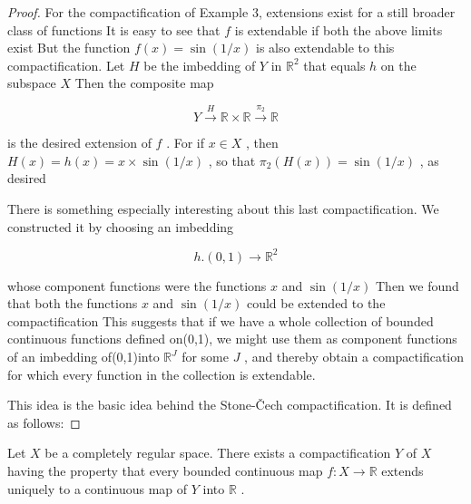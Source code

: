 \begin{proof}
For the compactification of Example 3, extensions exist for a still broader class of functions It is easy to see that \(f\) is extendable if both the above limits exist But the function \(f\left( x\right)  = \sin \left( {1/x}\right)\) is also extendable to this compactification. Let \(H\) be the imbedding of \(Y\) in \({\mathbb{R}}^{2}\) that equals \(h\) on the subspace \(X\) Then the composite map

\[
Y\overset{H}{ \rightarrow  }\mathbb{R} \times  \mathbb{R}\overset{{\pi }_{2}}{ \rightarrow  }\mathbb{R}
\]

is the desired extension of \(f\) . For if \(x \in  X\) , then \(H\left( x\right)  = h\left( x\right)  = x \times  \sin \left( {1/x}\right)\) , so that \({\pi }_{2}\left( {H\left( x\right) }\right)  = \sin \left( {1/x}\right)\) , as desired

There is something especially interesting about this last compactification. We constructed it by choosing an imbedding

\[
h.\left( {0,1}\right)  \rightarrow  {\mathbb{R}}^{2}
\]

whose component functions were the functions \(x\) and \(\sin \left( {1/x}\right)\) Then we found that both the functions \(x\) and \(\sin \left( {1/x}\right)\) could be extended to the compactification This suggests that if we have a whole collection of bounded continuous functions defined on(0,1), we might use them as component functions of an imbedding of(0,1)into \({\mathbb{R}}^{J}\) for some \(J\) , and thereby obtain a compactification for which every function in the collection is extendable.

This idea is the basic idea behind the Stone-Čech compactification. It is defined as follows:
\end{proof}
\begin{theorem} Let \(X\) be a completely regular space. There exists a compactification \(Y\) of \(X\) having the property that every bounded continuous map \(f : X \rightarrow  \mathbb{R}\) extends uniquely to a continuous map of \(Y\) into \(\mathbb{R}\) .
\end{theorem}

